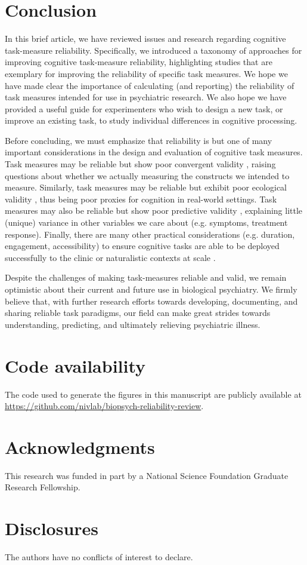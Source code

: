 \documentclass[a4paper,12pt]{article}
\begin{document}
\section{Conclusion}

In this brief article, we have reviewed issues and research regarding cognitive task-measure reliability. Specifically, we introduced a taxonomy of approaches for improving cognitive task-measure reliability, highlighting studies that are exemplary for improving the reliability of specific task measures. We hope we have made clear the importance of calculating (and reporting) the reliability of task measures intended for use in psychiatric research. We also hope we have provided a useful guide for experimenters who wish to design a new task, or improve an existing task, to study individual differences in cognitive processing. 

Before concluding, we must emphasize that reliability is but one of many important considerations in the design and evaluation of cognitive task measures. Task measures may be reliable but show poor convergent validity \cite{snijder2022psychometric, eckstein2022interpretation}, raising questions about whether we actually measuring the constructs we intended to measure. Similarly, task measures may be reliable but exhibit poor ecological validity \cite{Steiner2021-oq}, thus being poor proxies for cognition in real-world settings. Task measures may also be reliable but show poor predictive validity \cite{verdejo2021unified}, explaining little (unique) variance in other variables we care about (e.g. symptoms, treatment response). Finally, there are many other practical considerations (e.g. duration, engagement, accessibility) to ensure cognitive tasks are able to be deployed successfully to the clinic or naturalistic contexts at scale \cite{germine2021toward}. 

Despite the challenges of making task-measures reliable and valid, we remain optimistic about their current and future use in biological psychiatry. We firmly believe that, with further research efforts towards developing, documenting, and sharing reliable task paradigms, our field can make great strides towards understanding, predicting, and ultimately relieving psychiatric illness.

\section{Code availability}

The code used to generate the figures in this manuscript are publicly available at \break \url{https://github.com/nivlab/biopsych-reliability-review}.

\section{Acknowledgments}

This research was funded in part by a National Science Foundation Graduate Research Fellowship.

\section{Disclosures}

The authors have no conflicts of interest to declare.

\printbibliography
\end{document}
